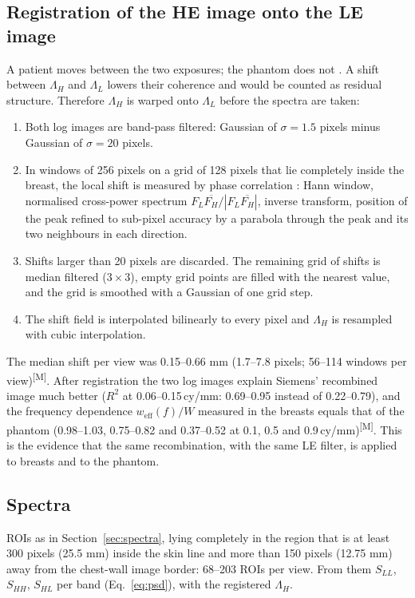 \documentclass[11pt,a4paper]{article}
\newcommand{\LL}{\Lambda_L}
\newcommand{\LH}{\Lambda_H}
\newcommand{\weff}{w_\mathrm{eff}}
\newcommand{\M}{\textsuperscript{[M]}}
\newcommand{\cymm}{\,cy/mm}
\begin{document}
\subsection{Registration of the HE image onto the LE image}\label{sec:registration}
A patient moves between the two exposures; the phantom does not \cite{allec2012,sistermanns2021}. A shift between
$\LH$ and $\LL$ lowers their
coherence and would be counted as residual structure. Therefore $\LH$ is warped onto $\LL$ before the spectra are
taken:
\begin{enumerate}
\item Both log images are band-pass filtered: Gaussian of $\sigma=1.5$ pixels minus Gaussian of $\sigma=20$ pixels.
\item In windows of 256 pixels on a grid of 128 pixels that lie completely inside the breast, the local shift is
measured by phase correlation \cite{foroosh2002,zitova2003}: Hann window, normalised cross-power spectrum
$F_L\overline{F_H}/|F_L\overline{F_H}|$, inverse transform, position of the peak refined to sub-pixel accuracy by a
parabola through the peak and its two neighbours in each direction.
\item Shifts larger than 20 pixels are discarded. The remaining grid of shifts is median filtered ($3\times3$), empty
grid points are filled with the nearest value, and the grid is smoothed with a Gaussian of one grid step.
\item The shift field is interpolated bilinearly to every pixel and $\LH$ is resampled with cubic interpolation.
\end{enumerate}
The median shift per view was 0.15--0.66 mm (1.7--7.8 pixels; 56--114 windows per view)\M. After registration the two
log images explain Siemens' recombined image much better ($R^2$ at 0.06--0.15\cymm: 0.69--0.95 instead of 0.22--0.79),
and the frequency dependence $\weff(f)/W$ measured in the breasts equals that of the phantom (0.98--1.03, 0.75--0.82
and 0.37--0.52 at 0.1, 0.5 and 0.9\cymm)\M. This is the evidence that the same recombination, with the same LE
filter, is applied to breasts and to the phantom.

\subsection{Spectra}
ROIs as in Section~\ref{sec:spectra}, lying completely in the region that is at least 300 pixels (25.5 mm) inside the
skin line and more than 150 pixels (12.75 mm) away from the chest-wall image border: 68--203 ROIs per view. From them
$S_{LL}$, $S_{HH}$, $S_{HL}$ per band (Eq.~\ref{eq:psd}), with the registered $\LH$.
\end{document}

